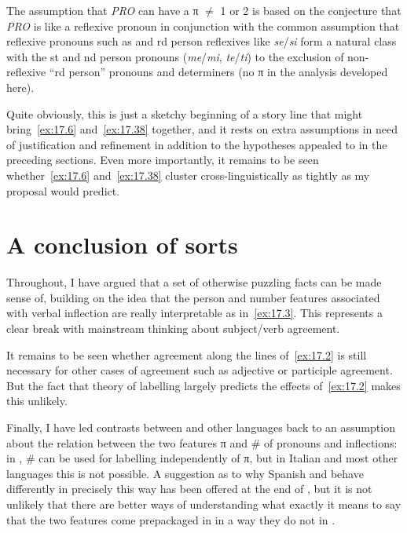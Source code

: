 \documentclass[output=paper]{langsci/langscibook}
\begin{document}
The assumption that \emph{PRO} can have a π ${\neq}$ 1 or 2 is based on
the conjecture that \emph{PRO} is like a reflexive pronoun in conjunction
with the common assumption that reflexive pronouns such as  and
\Third{}rd person reflexives like \emph{se}/\emph{si} form a natural class
with the \First{}st and \Second{}nd person pronouns (\emph{me}/\emph{mi},
\emph{te}/\emph{ti}) to the exclusion of non-reflexive ``\Third{}rd
person'' pronouns and determiners (no π in the analysis developed here).

Quite obviously, this is just a sketchy beginning of a story line that might
bring~\eqref{ex:17.6} and~\eqref{ex:17.38} together, and it rests on extra
assumptions in need of justification and refinement in addition to the
hypotheses appealed to in the preceding sections. Even more importantly, it
remains to be seen whether~\eqref{ex:17.6} and~\eqref{ex:17.38} cluster
cross-linguistically as tightly as my proposal would predict.

\section{A conclusion of sorts}\label{sec:17.9}

Throughout, I have argued that a set of otherwise puzzling facts can be made
sense of, building on the idea that the person and number features associated with verbal inflection are really
interpretable as in~\eqref{ex:17.3}. This represents a clear break with
mainstream thinking about subject/verb agreement.

It remains to be seen whether agreement along the lines of~\eqref{ex:17.2}
is still necessary for other cases of agreement such as adjective or participle
agreement. But the fact that  theory of
labelling largely predicts the effects of~\eqref{ex:17.2}
makes this unlikely.

Finally, I have led contrasts between  and other languages back to
an assumption about the relation between the two features π and \# of pronouns and inflections: in , \#
can be used for labelling independently of π, but in Italian and
most other languages this is not possible. A suggestion as to why Spanish and
 behave differently in precisely this way has been offered at the
end of , but it is not unlikely that there are better ways
of understanding what exactly it means to say that the two features come
prepackaged in  in a way they do not in .

\printchapterglossary{}

{\sloppy
\printbibliography[heading=subbibliography,notkeyword=this]
}
\end{document}
